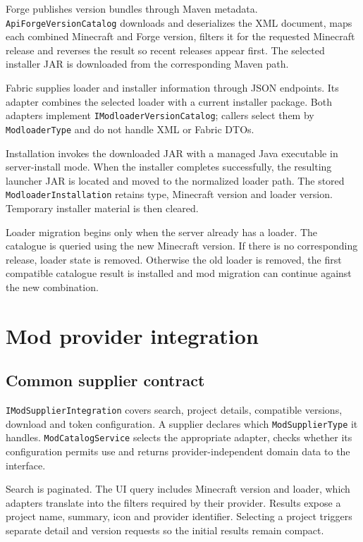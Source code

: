 Forge publishes version bundles through Maven metadata. \texttt{ApiForgeVersionCatalog} downloads and deserializes the XML document, maps each combined Minecraft and Forge version, filters it for the requested Minecraft release and reverses the result so recent releases appear first. The selected installer JAR is downloaded from the corresponding Maven path.

Fabric supplies loader and installer information through JSON endpoints. Its adapter combines the selected loader with a current installer package. Both adapters implement \texttt{IModloaderVersionCatalog}; callers select them by \texttt{ModloaderType} and do not handle XML or Fabric DTOs.

Installation invokes the downloaded JAR with a managed Java executable in server-install mode. When the installer completes successfully, the resulting launcher JAR is located and moved to the normalized loader path. The stored \texttt{ModloaderInstallation} retains type, Minecraft version and loader version. Temporary installer material is then cleared.

Loader migration begins only when the server already has a loader. The catalogue is queried using the new Minecraft version. If there is no corresponding release, loader state is removed. Otherwise the old loader is removed, the first compatible catalogue result is installed and mod migration can continue against the new combination.

\section{Mod provider integration}

\subsection{Common supplier contract}

\texttt{IModSupplierIntegration} covers search, project details, compatible versions, download and token configuration. A supplier declares which \texttt{ModSupplierType} it handles. \texttt{ModCatalogService} selects the appropriate adapter, checks whether its configuration permits use and returns provider-independent domain data to the interface.

Search is paginated. The UI query includes Minecraft version and loader, which adapters translate into the filters required by their provider. Results expose a project name, summary, icon and provider identifier. Selecting a project triggers separate detail and version requests so the initial results remain compact.

